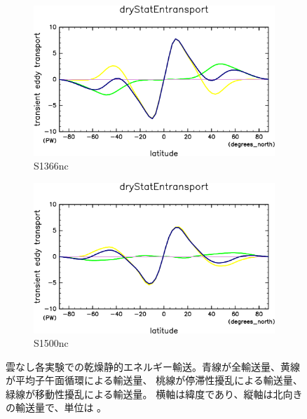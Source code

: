 \documentclass[body]{subfiles}
\begin{document}
\begin{figure}[t]
	\centering
	\begin{subfigure}{.4\textwidth}
		\centering
		\includegraphics[width=\columnwidth]{S1366-nc/MeriHeatTrans@dryStatEn,time=3650:4015-crop-rotate.pdf}
		\caption{S1366nc}\label{乾燥静的エネルギーS1366nc}
	\end{subfigure}
	\begin{subfigure}{.4\textwidth}
		\centering
		\includegraphics[width=\columnwidth]{S1500-nc/MeriHeatTrans@dryStatEn,time=3650:4015-crop-rotate.pdf}
		\caption{S1500nc}\label{乾燥静的エネルギーS1500nc}
	\end{subfigure}
	\caption[雲なし各実験での乾燥静的エネルギー輸送の内訳]{
		雲なし各実験での乾燥静的エネルギー輸送。青線が全輸送量、黄線が平均子午面循環による輸送量、
		桃線が停滞性擾乱による輸送量、緑線が移動性擾乱による輸送量。
		横軸は緯度であり、縦軸は北向きの輸送量で、単位は 。
	}\label{乾燥静的エネルギーnc}
\end{figure}
\end{document}
